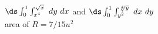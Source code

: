 {\noindent \begin{minipage}{\linewidth}
\end{minipage}
}
{$\ds\int_0^{1}\int_{x^4}^{\sqrt{x}}\ dy\ dx$ and $\ds\int_{0}^1\int_{y^2}^{\sqrt[4]{y}}\ dx\ dy$\\
area  of $R = 7/15u^2$
}

